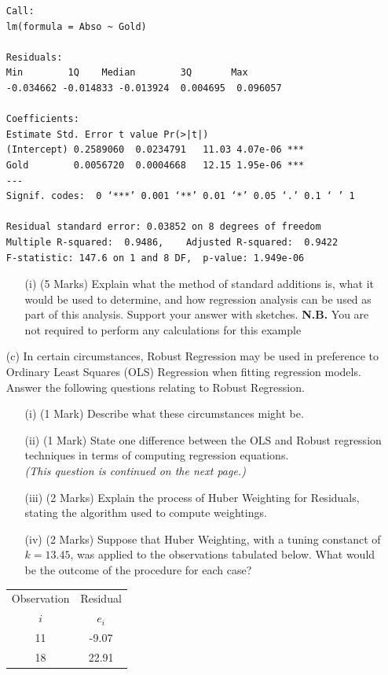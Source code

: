 \documentclass[a4paper,12pt]{article}
\begin{document}
\begin{itemize}
\begin{framed}
\begin{verbatim}
Call:
lm(formula = Abso ~ Gold)

Residuals:
Min        1Q    Median        3Q       Max 
-0.034662 -0.014833 -0.013924  0.004695  0.096057 

Coefficients:
Estimate Std. Error t value Pr(>|t|)    
(Intercept) 0.2589060  0.0234791   11.03 4.07e-06 ***
Gold        0.0056720  0.0004668   12.15 1.95e-06 ***
---
Signif. codes:  0 ‘***’ 0.001 ‘**’ 0.01 ‘*’ 0.05 ‘.’ 0.1 ‘ ’ 1

Residual standard error: 0.03852 on 8 degrees of freedom
Multiple R-squared:  0.9486,    Adjusted R-squared:  0.9422 
F-statistic: 147.6 on 1 and 8 DF,  p-value: 1.949e-06
\end{verbatim}
\end{framed}
\begin{itemize}
	\item[(i)] (5 Marks) Explain what the method of standard additions is, what it would be used to determine, and how regression analysis can be used as part of this analysis. Support your answer with sketches.
	\textbf{N.B.}  You are not required to perform any calculations for this example
	
 
\end{itemize}
\item[(c)]
In certain circumstances, Robust Regression may be used in preference to Ordinary Least Squares (OLS) Regression when fitting regression models. Answer the following questions relating to Robust Regression. 

\begin{itemize}
	\item[(i)] (1 Mark) Describe what these circumstances might be.
	\item[(ii)] (1 Mark) State one difference between the OLS and Robust regression techniques in terms of computing regression equations.
\\ \textit{(This question is continued on the next page.)}
	\newpage
	\item[(iii)] (2 Marks) Explain the process of Huber Weighting for Residuals, stating the algorithm used to compute weightings.

	\item[(iv)] (2 Marks) Suppose that Huber Weighting, with a tuning constanct of $k=13.45$, was applied to the observations 
	tabulated below. What would be the outcome of the procedure for each case? 
\end{itemize}
\begin{center}
	\begin{tabular}{|c|c|}
		\hline
		Observation & Residual \\ 
		$i$  & $e_i$ \\ \hline
		11 & -9.07 \\ \hline 
		18 & 22.91 \\ \hline
	\end{tabular} 
\end{center}


\end{itemize}
\end{document}
